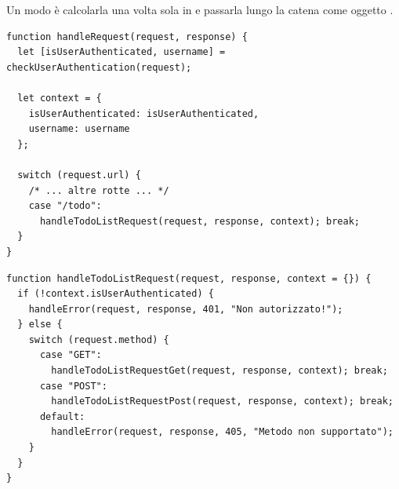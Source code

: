 Un modo è calcolarla una volta sola in  e passarla lungo
la catena come oggetto .

\begin{lstlisting}[style=js, name=router.js]
function handleRequest(request, response) {
  let [isUserAuthenticated, username] = checkUserAuthentication(request);

  let context = {
    isUserAuthenticated: isUserAuthenticated,
    username: username
  };

  switch (request.url) {
    /* ... altre rotte ... */
    case "/todo":
      handleTodoListRequest(request, response, context); break;
  }
}
\end{lstlisting}

\begin{affianco}[0.6][c]
\codicepiccolo
\begin{lstlisting}[style=js, name=todo-controller.js]
function handleTodoListRequest(request, response, context = {}) {
  if (!context.isUserAuthenticated) {
    handleError(request, response, 401, "Non autorizzato!");
  } else {
    switch (request.method) {
      case "GET":
        handleTodoListRequestGet(request, response, context); break;
      case "POST":
        handleTodoListRequestPost(request, response, context); break;
      default:
        handleError(request, response, 405, "Metodo non supportato");
    }
  }
}
\end{lstlisting}
\risultato
\begin{immagine}
\end{immagine}
\end{affianco}

